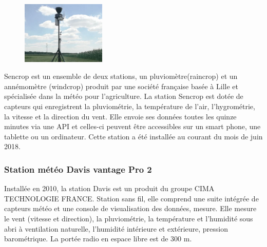 \begin{figure}
\includegraphics[width=4cm]{images/imageRang3.jpg}
\end{figure}
Sencrop est un ensemble de deux stations, un pluviomètre(raincrop) et un annémomètre (windcrop) produit par une société française basée à Lille et spécialisée dans la météo pour l’agriculture. La station Sencrop est dotée de capteurs qui enregistrent la pluviométrie, la température de l’air, l’hygrométrie, la vitesse et la direction du vent. Elle envoie ses données toutes les quinze minutes via une API et celles-ci peuvent être accessibles sur un smart phone, une tablette ou un ordinateur. Cette station a été installée au courant du mois de juin 2018. 

\subsubsection{Station météo Davis vantage Pro 2}

Installée en 2010, la station Davis est un produit du groupe CIMA TECHNOLOGIE FRANCE. Station sans fil, elle comprend une suite intégrée de capteurs météo et une console de visualisation des données, mesure. Elle mesure le vent (vitesse et direction), la pluviométrie, la température et l'humidité sous abri à ventilation naturelle, l'humidité intérieure et extérieure, pression barométrique. La portée radio en espace libre est de 300 m.


